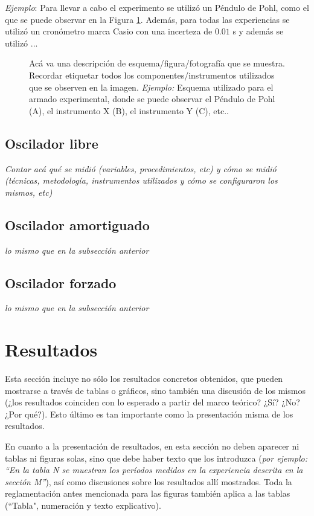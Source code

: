 \documentclass[12pt,a4paper]{article}
\begin{document}
\textit{Ejemplo}: Para llevar a cabo el experimento se utilizó un Péndulo de Pohl, como el que se puede observar en la Figura \ref{fig1}. Además, para todas las experiencias se utilizó un cronómetro marca Casio con una incerteza de $0.01$ s y además se utilizó ... 

\begin{figure}[ht]
    \centering
    \caption{Acá va una descripción de esquema/figura/fotografía que se muestra. Recordar etiquetar todos los componentes/instrumentos utilizados que se observen en la imagen. \textit{Ejemplo:} Esquema utilizado para el armado experimental, donde se puede observar el Péndulo de Pohl (A), el instrumento X (B), el instrumento Y (C), etc..}
    \label{fig1}
\end{figure}

\subsection{Oscilador libre}

\textit{Contar acá qué se midió (variables, procedimientos, etc) y cómo se midió (técnicas, metodología, instrumentos utilizados y cómo se configuraron los mismos, etc)}

\subsection{Oscilador amortiguado}

\textit{lo mismo que en la subsección anterior}

\subsection{Oscilador forzado}

\textit{lo mismo que en la subsección anterior}


\section{Resultados}

Esta sección incluye no sólo los resultados concretos obtenidos, que pueden mostrarse a través de tablas o gráficos, sino también una discusión de los mismos (¿los resultados coinciden con lo esperado a partir del marco teórico? ¿Sí? ¿No? ¿Por qué?). Esto último es tan importante como la presentación misma de los resultados.

En cuanto a la presentación de resultados, en esta sección no deben aparecer ni tablas ni figuras solas, sino que debe haber texto que los introduzca (\textit{por ejemplo: “En la tabla N se muestran los períodos medidos en la experiencia descrita en la sección M”}), así como discusiones sobre los resultados allí mostrados. Toda la reglamentación antes mencionada para las figuras también aplica a las tablas (“Tabla", numeración y texto explicativo).
\end{document}
